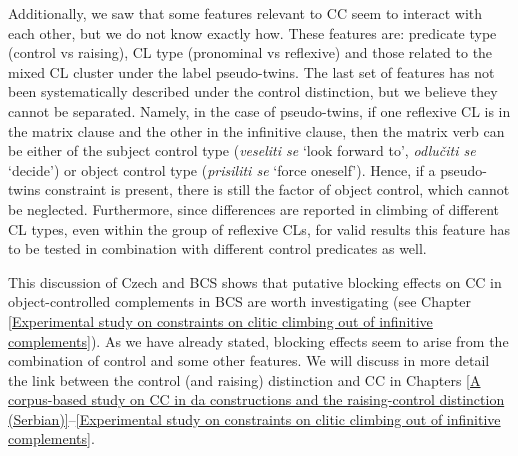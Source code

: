 Additionally, we saw that some features relevant to CC seem to interact with each other, but we do not know exactly how. These features are: predicate type (control vs raising), CL type (pronominal vs reflexive) and those related to the mixed CL cluster under the label pseudo-twins. The last set of features has not been systematically described under the control distinction, but we believe they cannot be separated. Namely, in the case of pseudo-twins, if one reflexive CL is in the matrix clause and the other in the infinitive clause, then the matrix verb can be either of the subject control type (\textit{veseliti se} ‘look forward to’, \textit{odlučiti se} ‘decide’) or object control type (\textit{prisiliti se} ‘force oneself’). Hence, if a pseudo-twins constraint is present, there is still the factor of object control, which cannot be neglected. Furthermore, since differences are reported in climbing of different CL types, even within the group of reflexive CLs, for valid results this feature has to be tested in combination with different control predicates as well. 

This discussion of Czech and BCS shows that putative blocking effects on CC in object-controlled complements in BCS are worth investigating (see Chapter \ref{Experimental study on constraints on clitic climbing out of infinitive complements}). As we have already stated, blocking effects seem to arise from the combination of control and some other features. We will discuss in more detail the link between the control (and raising) distinction and CC in Chapters \ref{A corpus-based study on CC in da constructions and the raising-control distinction (Serbian)}--\ref{Experimental study on constraints on clitic climbing out of infinitive complements}. 
